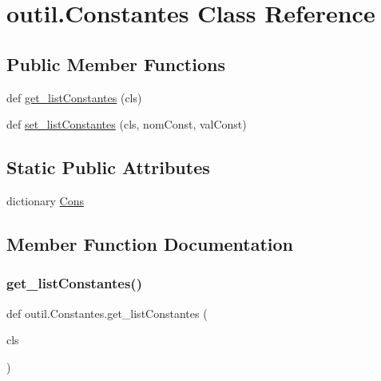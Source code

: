\hypertarget{classoutil_1_1_constantes}{}\section{outil.\+Constantes Class Reference}
\label{classoutil_1_1_constantes}
\subsection*{Public Member Functions}
\begin{DoxyCompactItemize}
\item 
def \hyperlink{classoutil_1_1_constantes_a186909cc903958f769aa531eb94dd264}{get\+\_\+list\+Constantes} (cls)
\item 
def \hyperlink{classoutil_1_1_constantes_af35fe7ebb9df8350160593eeb2436849}{set\+\_\+list\+Constantes} (cls, nom\+Const, val\+Const)
\end{DoxyCompactItemize}
\subsection*{Static Public Attributes}
\begin{DoxyCompactItemize}
\item 
dictionary \hyperlink{classoutil_1_1_constantes_acff4386578b87455388730ad468cbe64}{Cons}
\end{DoxyCompactItemize}


\subsection{Member Function Documentation}
\mbox{\label{classoutil_1_1_constantes_a186909cc903958f769aa531eb94dd264}} 
\subsubsection{\texorpdfstring{get\+\_\+list\+Constantes()}{get\_listConstantes()}}
{\footnotesize\ttfamily def outil.\+Constantes.\+get\+\_\+list\+Constantes (\begin{DoxyParamCaption}\item[{}]{cls }\end{DoxyParamCaption})}

